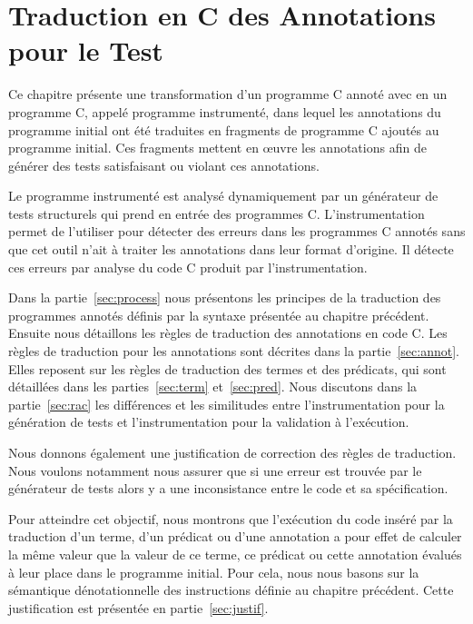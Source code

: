 
\chapter{Traduction en C des Annotations pour le Test}
\label{sec:traduction}

\chapterintro

Ce chapitre présente une transformation d'un programme C annoté avec \eacsl en
un programme C, appelé programme instrumenté, dans lequel les annotations
\eacsl du programme initial ont été traduites en fragments de programme C
ajoutés au programme initial.
Ces fragments mettent en \oe{}uvre les annotations \eacsl afin de générer des
tests satisfaisant ou violant ces annotations.

Le programme instrumenté est analysé dynamiquement par un générateur de tests
structurels qui prend en entrée des programmes C.
L'instrumentation permet de l'utiliser pour détecter des erreurs dans les
programmes C annotés sans que cet outil n'ait à traiter les annotations dans
leur format d'origine.
Il détecte ces erreurs par analyse du code C produit par l'instrumentation.

Dans la partie~\ref{sec:process} nous présentons les principes de la traduction
des programmes annotés définis par la syntaxe présentée au chapitre précédent.
Ensuite nous détaillons les règles de traduction des annotations \eacsl en code
C.
Les règles de traduction pour les annotations sont décrites dans la
partie~\ref{sec:annot}.
Elles reposent sur les règles de traduction des termes et des prédicats, qui
sont détaillées dans les parties~\ref{sec:term} et~\ref{sec:pred}.
Nous discutons dans la partie~\ref{sec:rac} les différences et les
similitudes entre l'instrumentation pour la génération de tests et
l'instrumentation pour la validation à l'exécution.

Nous donnons également une justification de correction des règles de
traduction.
Nous voulons notamment nous assurer que si une erreur est trouvée par le
générateur de tests alors y a une inconsistance entre le code et sa
spécification.

Pour atteindre cet objectif, nous montrons que l'exécution du code inséré par
la traduction d'un terme, d'un prédicat ou d'une annotation a pour effet de
calculer la même valeur que la valeur de ce terme, ce prédicat ou cette
annotation évalués à leur place dans le programme initial.
Pour cela, nous nous basons sur la sémantique dénotationnelle des instructions
définie au chapitre précédent.
Cette justification est présentée en partie~\ref{sec:justif}.


